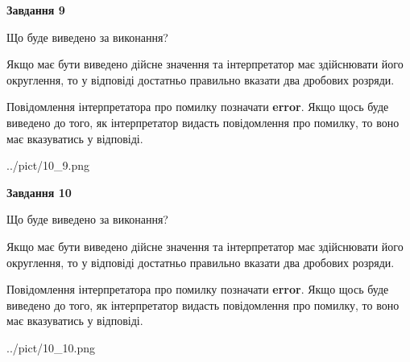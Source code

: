 \documentclass[12pt, ukrainian]{article}
\begin{document}
{\begin {Large}
{\begin {center}\textbf{Завдання 9}\end {center}}\par
Що буде виведено за виконання? \par

Якщо має бути виведено дійсне значення та інтерпретатор має здійснювати його округлення, 
то у відповіді достатньо правильно вказати два дробових розряди.

Повідомлення інтерпретатора про помилку позначати \textbf{error}.
Якщо щось буде виведено до того, як інтерпретатор видасть повідомлення про помилку, 
то воно має вказуватись у відповіді. \par

\begin{center}
	{../pict/10_9.png}
\end{center}
\newpage

{\begin {center}\textbf{Завдання 10}\end {center}}\par
Що буде виведено за виконання? \par

Якщо має бути виведено дійсне значення та інтерпретатор має здійснювати його округлення, 
то у відповіді достатньо правильно вказати два дробових розряди.

Повідомлення інтерпретатора про помилку позначати \textbf{error}.
Якщо щось буде виведено до того, як інтерпретатор видасть повідомлення про помилку, 
то воно має вказуватись у відповіді. \par

\begin{center}
	{../pict/10_10.png}
\end{center}
\newpage

\end {Large}}
\end{document}

